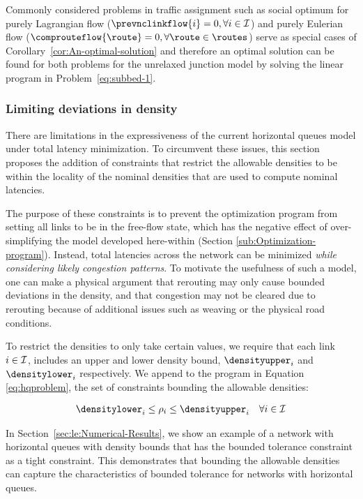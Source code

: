 Commonly considered problems in traffic assignment such as social
optimum for purely Lagrangian flow ($\prevnclinkflow{\link}=0,\forall\link\in\links$)
and purely Eulerian flow ($\comprouteflow{\route}=0,\forall\route\in\routes$)
serve as special cases of Corollary~\ref{cor:An-optimal-solution}
and therefore an optimal solution can be found for both problems for
the unrelaxed junction model by solving the linear program in Problem~\eqref{eq:subbed-1}. 


\subsubsection{Limiting deviations in density\label{sub:Limiting-Deviations-in}}

There are limitations in the expressiveness of the current horizontal
queues model under total latency minimization. To circumvent these
issues, this section proposes the addition of constraints that restrict
the allowable densities to be within the locality of the nominal densities
that are used to compute nominal latencies.

The purpose of these constraints is to prevent the optimization program
from setting all links to be in the free-flow state, which has the
negative effect of over-simplifying the model developed here-within
(Section \eqref{sub:Optimization-program}). Instead, total latencies
across the network can be minimized \emph{while considering likely
congestion patterns}. To motivate the usefulness of such a model,
one can make a physical argument that rerouting may only cause bounded
deviations in the density, and that congestion may not be cleared
due to rerouting because of additional issues such as weaving or the
physical road conditions.

To restrict the densities to only take certain values, we require
that each link $i\in\mathcal{I}$, includes an upper and lower density
bound, $\densityupper_{\link}$ and $\densitylower_{\link}$ respectively.
We append to the program in Equation \eqref{eq:hqproblem}, the set
of constraints bounding the allowable densities:

\begin{eqnarray*}
\densitylower_{\link} & \le\density_{\link}\le\densityupper_{\link} & \forall\link\in\links
\end{eqnarray*}


In Section~\ref{sec:le:Numerical-Results}, we show an example of a
network with horizontal queues with density bounds that has the bounded
tolerance constraint as a tight constraint. This demonstrates that
bounding the allowable densities can capture the characteristics of
bounded tolerance for networks with horizontal queues.


